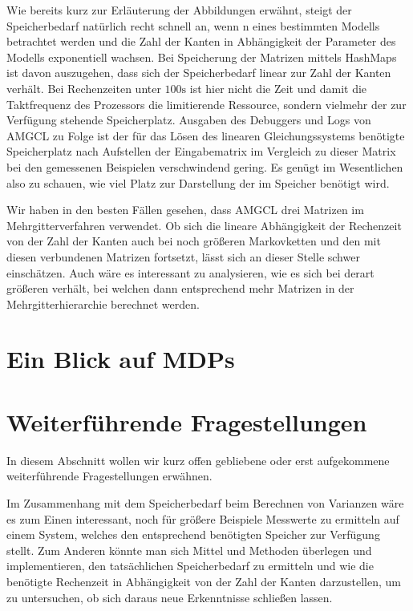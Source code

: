 \documentclass[a4paper]{article}
\theoremstyle{nonumberplain}
\begin{document}
Wie bereits kurz zur Erläuterung der Abbildungen erwähnt, steigt der Speicherbedarf natürlich recht schnell an, wenn \mc{}n eines bestimmten Modells betrachtet werden und die Zahl der Kanten in Abhängigkeit der Parameter des Modells exponentiell wachsen. Bei Speicherung der Matrizen mittels HashMaps ist davon auszugehen, dass sich der Speicherbedarf linear zur Zahl der Kanten verhält.
Bei Rechenzeiten unter $100\mathrm{s}$ ist hier nicht die Zeit und damit die Taktfrequenz des Prozessors die limitierende Ressource, sondern vielmehr der zur Verfügung stehende Speicherplatz. Ausgaben des Debuggers und Logs von AMGCL zu Folge ist der für das Lösen des linearen Gleichungssystems benötigte Speicherplatz nach Aufstellen der Eingabematrix im Vergleich zu dieser Matrix bei den gemessenen Beispielen verschwindend gering. Es genügt im Wesentlichen also zu schauen, wie viel Platz zur Darstellung der \mc{} im Speicher benötigt wird.

Wir haben in den besten Fällen gesehen, dass AMGCL drei Matrizen im Mehrgitterverfahren verwendet. Ob sich die lineare Abhängigkeit der Rechenzeit von der Zahl der Kanten auch bei noch größeren Markovketten und den mit diesen verbundenen Matrizen fortsetzt, lässt sich an dieser Stelle schwer einschätzen. Auch wäre es interessant zu analysieren, wie es sich bei derart größeren \mc{} verhält, bei welchen dann entsprechend mehr Matrizen in der Mehrgitterhierarchie berechnet werden.



\section{Ein Blick auf MDPs}

\section{Weiterführende Fragestellungen}

In diesem Abschnitt wollen wir kurz offen gebliebene oder erst aufgekommene weiterführende Fragestellungen erwähnen.


Im Zusammenhang mit dem Speicherbedarf beim Berechnen von Varianzen wäre es zum Einen interessant, noch für größere Beispiele Messwerte zu ermitteln auf einem System, welches den entsprechend benötigten Speicher zur Verfügung stellt. Zum Anderen könnte man sich Mittel und Methoden überlegen und implementieren, den tatsächlichen Speicherbedarf zu ermitteln und wie die benötigte Rechenzeit in Abhängigkeit von der Zahl der Kanten darzustellen, um zu untersuchen, ob sich daraus neue Erkenntnisse schließen lassen.
\end{document}
